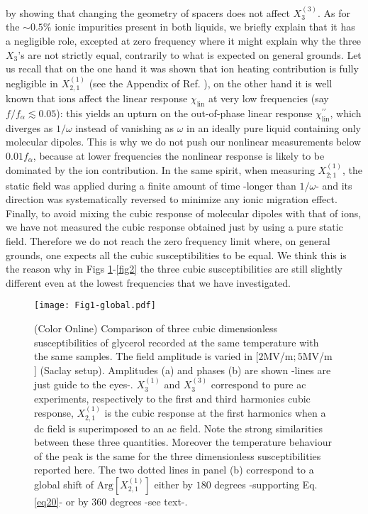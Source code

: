\documentclass[single column,pre]{revtex4}
\begin{document}
by showing that changing the geometry of spacers does not affect $X_3^{(3)}$. As for  the $\sim 0.5\%$ ionic impurities present in both liquids, we briefly explain that it has a negligible role, excepted at zero frequency where it might explain why the three $X_3$'s are not strictly equal, contrarily to what is expected on general grounds. Let us recall that on the one hand  it was shown that ion heating contribution  is fully negligible in $X_{2,1}^{(1)}$ (see the Appendix of Ref. \cite{Lho14}), on the other hand it is well known that ions affect the linear response $\chi_{\text{lin}}$ at very low frequencies (say $f/f_{\alpha} \lesssim 0.05$): this yields an upturn on the out-of-phase linear response $\chi^{\prime \prime}_{\text{lin}}$, which diverges as $1/\omega$ instead of vanishing as $\omega$ in an ideally pure liquid containing only molecular dipoles.  This is why we do not push our nonlinear measurements below $0.01 f_{\alpha}$, because at lower frequencies the nonlinear response is likely to be dominated by the ion contribution. In the same spirit, when measuring $X_{2;1}^{(1)}$, the static field was applied during a finite amount of time -longer than $1/\omega$- and its direction was systematically reversed to minimize any ionic migration effect. Finally, to avoid mixing the cubic response of molecular dipoles with that of ions, we have not measured the cubic response obtained just by using a pure static field. Therefore we do not reach the zero frequency limit where, on general grounds, one expects all the cubic susceptibilities to be equal. We think this is the reason why in Figs  \ref{fig1}-\ref{fig2} the three cubic susceptibilities are still slightly different even at the lowest frequencies that we have investigated.
 

\begin{figure}[t] 
\texttt{[image: Fig1-global.pdf]}
\caption{(Color Online) Comparison of three cubic dimensionless susceptibilities of glycerol recorded at the same temperature with the same samples. The field amplitude is varied in $[2$MV/m$;5$MV/m$]$  (Saclay setup). Amplitudes (a) and phases (b) are shown -lines are just guide to the eyes-. $X_3^{(1)}$ and $X_3^{(3)}$ correspond to pure ac experiments, respectively to the first and third harmonics cubic response, $X_{2,1}^{(1)}$ is the cubic response at 
the first harmonics when a dc field is superimposed to an ac field. Note the strong similarities between these three quantities. Moreover the temperature behaviour of the peak is the same for the three dimensionless susceptibilities reported here. The two dotted lines in panel (b) correspond to a global shift of $\mathrm{Arg}[X_{2,1}^{(1)}]$ either by $180$ degrees -supporting Eq. \ref{eq20}- or by $360$ degrees -see text-.} 
\label{fig1}
\end{figure}
\end{document}
